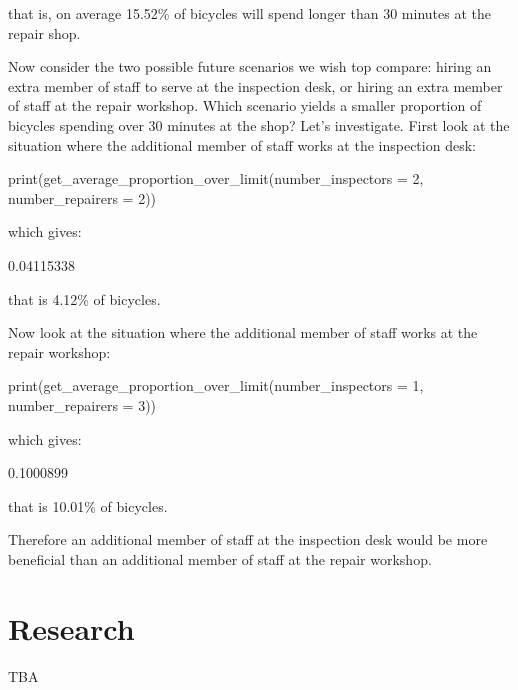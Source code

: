 that is, on average 15.52\% of bicycles will spend longer than 30 minutes at the
repair shop.

Now consider the two possible future scenarios we wish top compare: hiring an
extra member of staff to serve at the inspection desk, or hiring an extra member
of staff at the repair workshop. Which scenario yields a smaller proportion of
bicycles spending over 30 minutes at the shop? Let's investigate. First look at
the situation where the additional member of staff works at the inspection desk:

\begin{Rin}
print(get_average_proportion_over_limit(number_inspectors = 2, number_repairers = 2))
\end{Rin}

which gives:

\begin{Rout}
[1] 0.04115338
\end{Rout}

that is 4.12\% of bicycles.

Now look at the situation where the additional member of staff works at the
repair workshop:

\begin{Rin}
print(get_average_proportion_over_limit(number_inspectors = 1, number_repairers = 3))
\end{Rin}

which gives:

\begin{Rout}
[1] 0.1000899
\end{Rout}

that is 10.01\% of bicycles.

Therefore an additional member of staff at the inspection desk would be more
beneficial than an additional member of staff at the repair workshop.


\section{Research}\label{sec:research}

TBA
